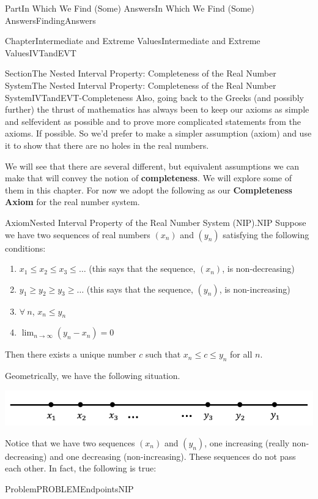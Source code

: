 \documentclass[oneside,10pt,]{book}
\newcommand{\terminology}[1]{\textbf{#1}}
\numberwithin{equation}{part}
\def\limit#1#2#3{{\displaystyle\lim_{#1\rightarrow #2}#3}}
\begin{document}
\begin{partptx}{Part}{In Which We Find (Some) Answers}{}{In Which We Find (Some) Answers}{}{}{FindingAnswers}
\begin{chapterptx}{Chapter}{Intermediate and Extreme Values}{}{Intermediate and Extreme Values}{}{}{IVTandEVT}
\begin{sectionptx}{Section}{The Nested Interval Property: Completeness of the Real Number System}{}{The Nested Interval Property: Completeness of the Real Number System}{}{}{IVTandEVT-Completeness}
Also, going back to the Greeks (and possibly further) the thrust of mathematics has always been to keep our axioms as simple and self\textendash{}evident as possible and to prove more complicated statements from the axioms. If possible. So we'd prefer to make a simpler assumption (axiom) and use it to show that there are no holes in the real numbers.%
\par
We will see that there are several different, but equivalent assumptions we can make that will convey the notion of \terminology{completeness}.  We will explore some of them in this chapter.  For now we adopt the following as our \terminology{Completeness Axiom} for the real number system.%
\begin{axiom}{Axiom}{Nested Interval Property of the Real Number System (NIP).}{}{NIP}%
%
Suppose we have two sequences of real numbers \(\left(x_n\right)\) and \(\left(y_n\right)\) satisfying the following conditions:%
\par
%
\begin{enumerate}
\item{}\(x_1\leq x_2\leq x_3\leq\ldots\) (this says that the sequence, \(\left(x_n\right)\), is non-decreasing)%
\item{}\(y_1\geq y_2\geq y_3\geq\ldots\) (this says that the sequence, \(\left(y_n\right)\), is non-increasing)%
\item{}\(\forall\  n\), \(x_n\leq y_n\)%
\item{}\(\displaystyle \limit{n}{\infty}{\left(y_n-x_n\right)}=0\)%
\end{enumerate}
%
\par
Then there exists a unique number \(c\) such that \(x_n\leq c\leq y_n\) for all \(n\).%
\end{axiom}
Geometrically, we have the following situation.%
\begin{image}{0.125}{0.75}{0.125}{}%
\includegraphics[width=\linewidth]{external/images/Ch6fig3.png}
\end{image}%
Notice that we have two sequences \(\left(x_n\right)\) and \(\left(y_n\right)\), one increasing (really non-decreasing) and one decreasing (non-increasing).  These sequences do not pass each other.  In fact, the following is true:%
\begin{problem}{Problem}{}{PROBLEMEndpointsNIP}%

\end{problem}
\end{sectionptx}
\end{chapterptx}
\end{partptx}
\end{document}
